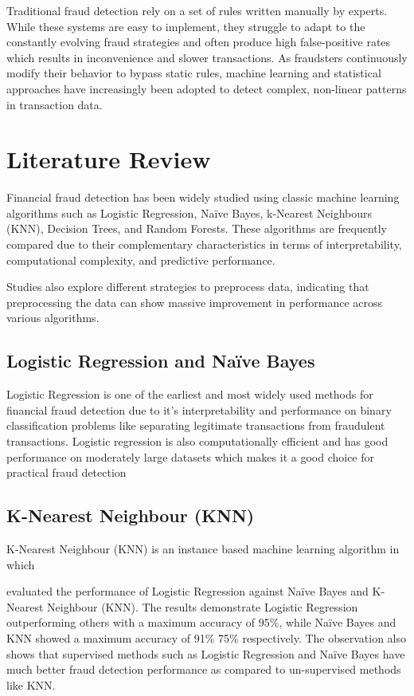 \documentclass{article}
\begin{document}
Traditional fraud detection rely on a set of rules written manually by experts. While these systems are easy to implement, they struggle to adapt to the constantly evolving fraud strategies and often produce high false-positive rates which results in inconvenience and slower transactions. As fraudsters continuously modify their behavior to bypass static rules, machine learning and statistical approaches have increasingly been adopted to detect complex, non-linear patterns in transaction data.

\section{Literature Review}

Financial fraud detection has been widely studied using classic machine learning algorithms such as Logistic Regression, Naïve Bayes, k-Nearest Neighbours (KNN), Decision Trees, and Random Forests. These algorithms are frequently compared due to their complementary characteristics in terms of interpretability, computational complexity, and predictive performance.

Studies also explore different strategies to preprocess data, indicating that preprocessing the data can show massive improvement in performance across various algorithms. 

\subsection{Logistic Regression and Naïve Bayes}

Logistic Regression is one of the earliest and most widely used methods for financial fraud detection due to it's interpretability and performance on binary  classification problems like separating legitimate transactions from fraudulent transactions. Logistic regression is also computationally efficient and has 
good performance on moderately large datasets which makes it a good choice for practical fraud detection \citep{gupta2025fraud}

\subsection{K-Nearest Neighbour (KNN)}

K-Nearest Neighbour (KNN) is an instance based machine learning algorithm in which 

\citet{Itoo2020} evaluated the performance of Logistic Regression against Naïve Bayes and K-Nearest Neighbour (KNN). The results demonstrate Logistic Regression outperforming others with a maximum accuracy of 95\%, while Naïve Bayes and KNN showed a maximum accuracy of 91\% 75\% respectively. The observation also shows that supervised methods such as Logistic Regression and Naïve Bayes have much better fraud detection performance as compared to un-supervised methods like KNN.
\end{document}
